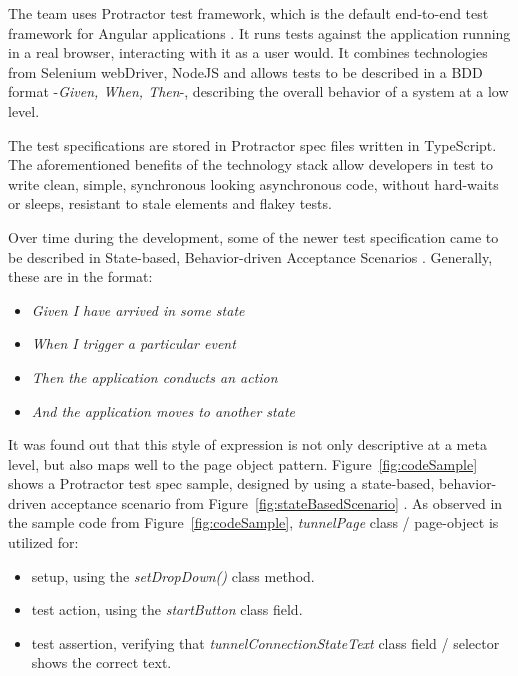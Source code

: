 \documentclass[conference]{IEEEtran}
\begin{document}
	The team uses Protractor test framework, which is the default end-to-end test framework for Angular applications \cite{protractor}.
	It runs tests against the application running in a real browser, interacting with it as a user would.
	It combines technologies from Selenium webDriver, NodeJS and allows tests to be described in a BDD format -\textit{Given, When, Then}-, describing the overall behavior of a system at a low level.
	
	The test specifications are stored in Protractor spec files written in TypeScript. 
	The aforementioned benefits of the technology stack allow developers in test to write clean, simple, synchronous looking asynchronous code, without hard-waits or sleeps, resistant to stale elements and flakey tests.

	Over time during the development, some of the newer test specification came to be described in State-based, Behavior-driven Acceptance Scenarios \cite{stateobjects}. 
	Generally, these are in the format:

	\begin{itemize}
		\item [] \textit{Given I have arrived in some state}
		\item [] \textit{When I trigger a particular event}
		\item [] \textit{Then the application conducts an action}
		\item [] \textit{And the application moves to another state}
	\end{itemize}
	
	It was found out that this style of expression is not only descriptive at a meta level, but also maps well to the page object pattern.
	Figure~\ref{fig:codeSample} shows a Protractor test spec sample, designed by using a state-based, behavior-driven acceptance scenario from Figure~\ref{fig:stateBasedScenario} .
	As observed in the sample code from Figure~\ref{fig:codeSample}, \textit{tunnelPage} class / page-object is utilized for:
	
	\begin{itemize}
		\item setup, using the \textit{setDropDown()} class method. 
		\item test action, using the \textit{startButton} class field.
		\item test assertion, verifying that \textit{tunnelConnectionStateText} class field / selector shows the correct text.
	\end{itemize}
\end{document}
